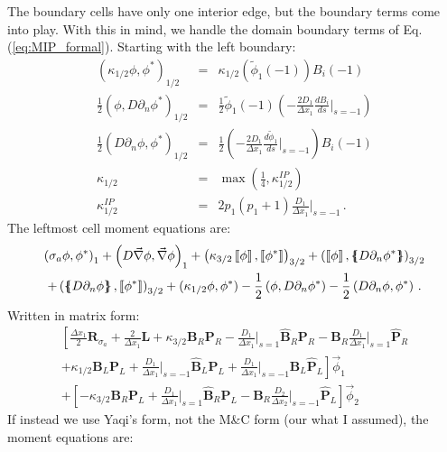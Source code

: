 \documentclass[11pt]{article}
\newcommand{\beanum}{\begin{eqnarray}}
\newcommand{\eeanum}{\end{eqnarray}}
\newcommand{\eqt}[1]{Eq. (\ref{#1})}
\newcommand{\del}{\ensuremath{ \vec{\nabla} }}
\newcommand{\B}[1]{\ensuremath{{B_{#1} }}}
\newcommand{\p}{\ensuremath{ d}}
\newcommand{\jmp}[1]{\ensuremath{\left\llbracket #1 \right\rrbracket}}
\newcommand{\avg}[1]{\ensuremath{ \left \{ \hspace{-0.055in} \left \{ #1  \right \}\hspace{-0.055in} \right \} }}
\newcommand{\pep}{\, .}
\begin{document}
The boundary cells have only one interior edge, but the boundary terms come into play.
With this in mind, we handle the domain boundary terms of \eqt{eq:MIP_formal}.
Starting with the left boundary:
\beanum
\left( \kappa_{1/2} \phi, \phi^*\right)_{1/2} &=& \kappa_{1/2}\left(\widetilde{\phi}_1(-1) \right) \B{i}(-1) \\
\frac{1}{2}\left( \phi, D\partial_n \phi^* \right)_{1/2} &=&  \frac{1}{2}\widetilde{\phi}_1(-1) \left(-\frac{2 D_1}{\Delta x_1} \frac{\p \B{i}}{\p s} \bigg \lvert_{s=-1} \right)\\
\frac{1}{2}\left( D \partial_n \phi , \phi^* \right)_{1/2} &=& \frac{1}{2}\left(- \frac{2D_1}{\Delta x_1} \frac{\p \widetilde{\phi}_1}{\p s} \bigg \lvert_{s=-1} \right) \B{i}(-1) \\
\kappa_{1/2} &=& \max \left( \frac{1}{4},\kappa_{1/2}^{IP} \right) \\
\kappa_{1/2}^{IP} &=& 2 p_1 (p_1 + 1)\frac{D_1}{\Delta x_1}\bigg \lvert_{s=-1} \pep
\eeanum
The leftmost cell moment equations are:
\begin{multline*}
\left( \sigma_a\phi,\phi^* \right)_1 + \left( D\del\phi,\del\phi \right)_1
  +\left( \kappa_{3/2} \jmp{\phi},\jmp{\phi^*}\right)_{3/2} 
 +\left(  \jmp{\phi}, \avg{ D\partial_n \phi^*}\right)_{3/2} \\
 +\left( \avg{D\partial_n\phi}, \jmp{\phi^*} \right)_{3/2} 
 + (\kappa_{1/2} \phi, \phi^*) - \frac{1}{2}\left( \phi,D\partial_n \phi^*  \right) - \frac{1}{2}\left( D\partial_n \phi, \phi^* \right) \pep
\end{multline*}
%
%
Written in matrix form:
\begin{multline}
\left[ \frac{\Delta x_1}{2}\mathbf{R}_{\sigma_a} + \frac{2}{\Delta x_1}\mathbf{L} + \kappa_{3/2} \mathbf{ B}_R \mathbf{P}_R - \frac{D_1}{\Delta x_1} \bigg \lvert_{s=1} \widehat{\mathbf B}_R  \mathbf{P}_R
-\mathbf{B}_R \frac{D_1}{\Delta x_1}\bigg \lvert_{s=1} \widehat{\mathbf P}_R \right. \\
 \left. + \kappa_{1/2} \mathbf{B}_L \mathbf{P}_L + \frac{D_1}{\Delta x_1} \bigg \lvert_{s=-1} \widehat{\mathbf B}_L \mathbf{P}_L + \frac{D_1}{\Delta x_1} \bigg \lvert_{s=-1} \mathbf{B}_L \widehat{\mathbf P}_L \right]\vec{\phi}_1 \\
%
+ \left[ -\kappa_{3/2} \mathbf{ B}_R \mathbf{P}_L + \frac{D_1}{\Delta x_1} \bigg \lvert_{s=1} \widehat{\mathbf B}_R \mathbf{P}_L  
-\mathbf{B}_R \frac{D_2}{\Delta x_2} \bigg \lvert_{s=-1} \widehat{\mathbf P}_L \right] \vec{\phi}_2
\end{multline}
%
If instead we use Yaqi's form, not the M\&C form (our what I assumed), the moment equations are:
\end{document}
